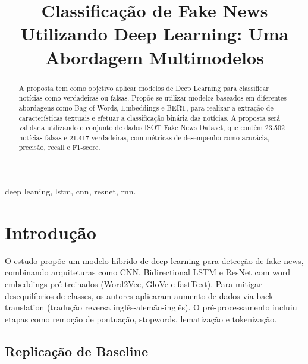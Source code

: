 \documentclass[conference]{IEEEtran}
\begin{document}
\title{Classificação de Fake News Utilizando Deep Learning: Uma Abordagem Multimodelos}

\author{
\and
{}
}

\maketitle

\begin{abstract}
A  proposta tem como objetivo aplicar modelos de Deep Learning para classificar notícias como verdadeiras ou falsas. Propõe-se utilizar modelos baseados em diferentes abordagens como Bag of Words, Embeddings e BERT, para realizar a extração de características textuais e efetuar a classificação binária das notícias. A proposta será validada utilizando o conjunto de dados ISOT Fake News Dataset, que contém 23.502 notícias falsas e 21.417 verdadeiras, com métricas de desempenho como acurácia, precisão, recall e F1-score.
\end{abstract}

\begin{IEEEkeywords}
deep leaning, lstm, cnn, resnet, rnn.
\end{IEEEkeywords}

\section{Introdução}
O estudo propõe um modelo híbrido de deep learning para detecção de fake news, combinando arquiteturas como CNN, Bidirectional LSTM e ResNet com word embeddings pré-treinados (Word2Vec, GloVe e fastText). Para mitigar desequilíbrios de classes, os autores aplicaram aumento de dados via back-translation (tradução reversa inglês-alemão-inglês). O pré-processamento incluiu etapas como remoção de pontuação, stopwords, lematização e tokenização.

\subsection{Replicação de Baseline}
\end{document}
